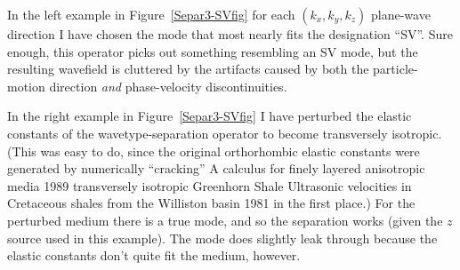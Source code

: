 In the left example in Figure~\ref{Separ3-SVfig}
for each $(k_x,k_y,k_z)$ plane-wave direction
I have chosen the mode that most nearly fits the designation ``SV''.
Sure enough, this operator picks out something resembling an SV mode,
but the resulting wavefield is cluttered by the artifacts caused by
both the particle-motion direction {\em and} phase-velocity
discontinuities.

In the right example in Figure~\ref{Separ3-SVfig}
I have perturbed the elastic constants of the
wavetype-separation operator to become transversely isotropic.
(This was easy to do, since the original orthorhombic elastic constants
were generated by numerically ``cracking''
{A calculus for finely layered anisotropic media}
{1989}
transversely isotropic
Greenhorn Shale
{Ultrasonic velocities in Cretaceous shales from the Williston basin}
{1981}
in the first place.)
For the perturbed medium there is a true {\qSV} mode, and
so the separation works (given the $z$ source used in this example).
The {\qP} mode does slightly leak through because the elastic constants
don't quite fit the medium, however.
